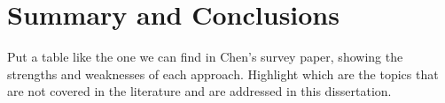 \section{Summary and Conclusions}
\label{sec:soa:summary}

Put a table like the one we can find in Chen's survey paper, showing the strengths and weaknesses of each approach. Highlight which are the topics that are not covered in the literature and are addressed in this dissertation.